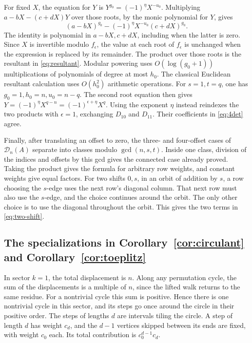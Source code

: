 \documentclass[11pt,reqno]{amsart}
\theoremstyle{remark}
\numberwithin{equation}{section}
\begin{document}
For fixed \(X\), the equation for \(Y\) is \(Y^{g_0}=(-1)^\eta
X^{-u_0}\). Multiplying \(a-bX-(c+dX)Y\) over those roots, by the monic
polynomial for \(Y\), gives
\[
 (a-bX)^{g_0}-(-1)^\eta X^{-u_0}(c+dX)^{g_0}.
\]
The identity is polynomial in \(a-bX,c+dX\), including when the latter is
zero. Since \(X\) is invertible modulo \(f_\epsilon\), the value at each
root of \(f_\epsilon\) is unchanged when the expression is replaced by
its remainder. The product over those roots is the resultant in
\eqref{eq:resultant}. Modular powering uses \(O(\log(g_0+1))\)
multiplications of polynomials of degree at most \(h_0\). The classical
Euclidean resultant calculation uses \(O(h_0^2)\) arithmetic operations.
For \(s=1,t=q\), one has \(g_0=1,h_0=n,u_0=n-q\). The second root
equation then gives \(Y=(-1)^\eta X^{q-n}=(-1)^{\epsilon+\eta}X^q\).
Using the exponent \(\eta\) instead reindexes the two products with
\(\epsilon=1\), exchanging \(D_{10}\) and \(D_{11}\). Their coefficients
in \eqref{eq:4det} agree.

Finally, after translating an offset to zero, the three- and four-offset
cases of \(\mathcal D_n(A)\) separate into classes modulo
\(\gcd(n,s,t)\). Inside one class, division of the indices and offsets by
this gcd gives the connected case already proved. Taking the product
gives the formula for arbitrary row weights, and constant weights give
equal factors. For two shifts \(0,s\), in an orbit of addition by \(s\),
a row choosing the \(s\)-edge uses the next row's diagonal column. That
next row must also use the \(s\)-edge, and the choice continues around
the orbit. The only other choice is to use the diagonal throughout the
orbit. This gives the two terms in \eqref{eq:two-shift}.

\subsection{The specializations in Corollary~\ref{cor:circulant} and Corollary~\ref{cor:toeplitz}}

In sector \(k=1\), the total displacement is \(n\). Along any permutation
cycle, the sum of the displacements is a multiple of \(n\), since the
lifted walk returns to the same residue. For a nontrivial cycle this sum
is positive. Hence there is one nontrivial cycle in this sector, and its
steps go once around the circle in their positive order. The steps of
lengths \(d\) are intervals tiling the circle. A step of length \(d\) has
weight \(c_d\), and the \(d-1\) vertices skipped between its ends are
fixed, with weight \(c_0\) each. Its total contribution is
\(c_0^{d-1}c_d\).
\end{document}
